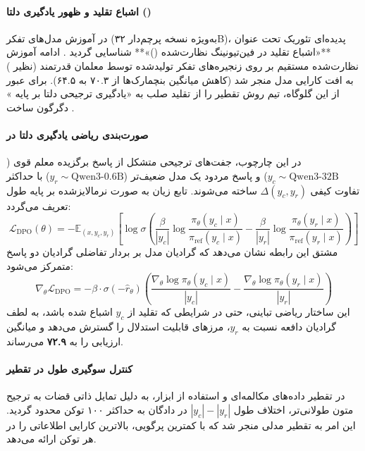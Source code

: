 \item {}

\paragraph*{اشباع تقلید و ظهور یادگیری دلتا ()}
در آموزش مدل‌های تفکر  (به‌ویژه نسخه پرچم‌دار ۳۲B)، پدیده‌ای تئوریک تحت عنوان **«اشباع تقلید در فین‌تیونینگ نظارت‌شده ()»** شناسایی گردید \cite{olmo2025v3}. ادامه آموزش نظارت‌شده مستقیم بر روی زنجیره‌های تفکر تولیدشده توسط معلمان قدرتمند (نظیر ) به افت کارایی مدل منجر شد (کاهش میانگین بنچمارک‌ها از ۷۰.۳ به ۶۴.۵). برای عبور از این گلوگاه، تیم  روش تقطیر را از تقلید صلب به «یادگیری ترجیحی دلتا بر پایه » دگرگون ساخت \cite{geng2025delta}.

\paragraph*{صورت‌بندی ریاضی یادگیری دلتا در }
در این چارچوب، جفت‌های ترجیحی متشکل از پاسخ برگزیده معلم قوی ($y_c \sim \text{Qwen3-32B}$) و پاسخ مردود یک مدل ضعیف‌تر ($y_r \sim \text{Qwen3-0.6B}$) با حداکثر تفاوت کیفی $\Delta(y_c, y_r)$ ساخته می‌شوند. تابع زیان  به صورت نرمالایز‌شده بر پایه طول تعریف می‌گردد:
\begin{equation}
    \mathcal{L}_{\mathrm{DPO}}(\theta) = -\mathbb{E}_{(x, y_c, y_r)} \left[ \log \sigma \left( \frac{\beta}{|y_c|} \log \frac{\pi_\theta(y_c \mid x)}{\pi_{\text{ref}}(y_c \mid x)} - \frac{\beta}{|y_r|} \log \frac{\pi_\theta(y_r \mid x)}{\pi_{\text{ref}}(y_r \mid x)} \right) \right]
\end{equation}
مشتق این رابطه نشان می‌دهد که گرادیان مدل بر بردار تفاضلی گرادیان دو پاسخ متمرکز می‌شود:
\begin{equation}
    \nabla_\theta \mathcal{L}_{\mathrm{DPO}} = -\beta \cdot \sigma(-\hat{r}_\theta) \left( \frac{\nabla_\theta \log \pi_\theta(y_c \mid x)}{|y_c|} - \frac{\nabla_\theta \log \pi_\theta(y_r \mid x)}{|y_r|} \right)
\end{equation}
این ساختار ریاضی تباینی، حتی در شرایطی که تقلید از $y_c$ اشباع شده باشد، به لطف گرادیان دافعه نسبت به $y_r$، مرزهای قابلیت استدلال را گسترش می‌دهد و میانگین ارزیابی را به \textbf{۷۲.۹} می‌رساند.

\paragraph*{کنترل سوگیری طول در تقطیر }
در تقطیر داده‌های مکالمه‌ای و استفاده از ابزار، به دلیل تمایل ذاتی قضات  به ترجیح متون طولانی‌تر، اختلاف طول $|y_c| - |y_r|$ در دادگان به حداکثر ۱۰۰ توکن محدود گردید. این امر به تقطیر مدلی منجر شد که با کمترین پرگویی، بالاترین کارایی اطلاعاتی را در هر توکن ارائه می‌دهد.

